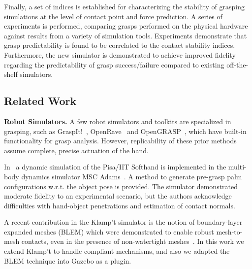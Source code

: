 Finally, a set of indices is established for characterizing the stability of grasping simulations at the level of contact point and force prediction.  A  series of experiments is performed, comparing grasps performed on the physical hardware against results from a variety of simulation tools. Experiments demonstrate that grasp predictability is found to be correlated to the contact stability indices.  Furthermore, the new simulator is demonstrated to achieve improved fidelity regarding the predictability of grasp success/failure compared to existing off-the-shelf simulators.  


\subsection{Related Work}\label{related_work_grasp}
{\bf Robot Simulators.}
A few robot simulators and toolkits are specialized in grasping, such as GraspIt!~\cite{Miller04}, OpenRave~\cite{Diankov08OpenRAVE} and OpenGRASP~\cite{Leon10OpenGRASP}, which have built-in functionality for grasp analysis. However, replicability of these prior methods assume complete, precise actuation of the hand.

In~\cite{Bonilla14} a dynamic simulation of the Pisa/IIT Softhand is implemented in the multi-body dynamics simulator MSC Adams~\cite{MSCAdams}. A method to generate pre-grasp palm configurations w.r.t. the object pose is provided. The simulator demonstrated moderate fidelity to an experimental scenario, but the authors acknowledge difficulties with hand-object penetrations and estimation of contact normals.

 A recent contribution in the Klamp't simulator is the notion of boundary-layer expanded meshes (BLEM) which were demonstrated to enable robust mesh-to-mesh contacts, even in the presence of non-watertight meshes~\cite{Hauser13BLEM}. In this work we extend Klamp't to handle compliant mechanisms, and also we adapted the BLEM technique into Gazebo as a plugin.

